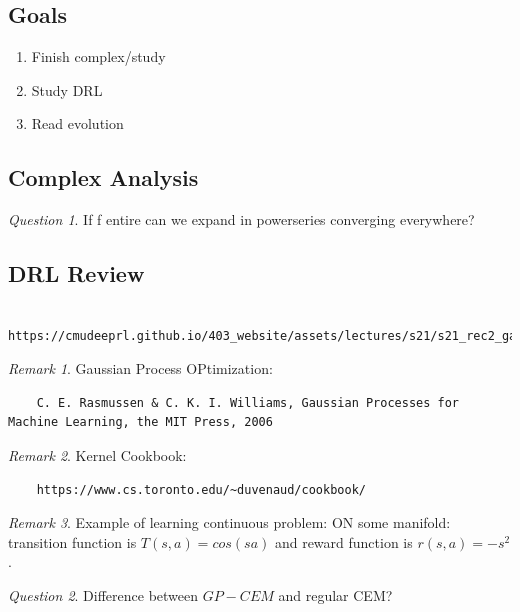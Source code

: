 \documentclass[11pt]{article}
\theoremstyle{remark}
\newtheorem{remark}{Remark}
\newtheorem{quest}{Question}
\begin{document}
\subsection{Goals}

\begin{enumerate}
	\item Finish complex/study
	\item Study DRL
	\item Read evolution
\end{enumerate}

\subsection{Complex Analysis}

\begin{quest}
	If f entire can we expand in powerseries converging everywhere?
\end{quest}

\subsection{DRL Review}

\begin{verbatim}
	https://cmudeeprl.github.io/403_website/assets/lectures/s21/s21_rec2_gaussian_process.pdf
\end{verbatim}

\begin{remark}Gaussian Process OPtimization: 
\begin{verbatim}
	C. E. Rasmussen & C. K. I. Williams, Gaussian Processes for Machine Learning, the MIT Press, 2006
\end{verbatim}
\end{remark}

\begin{remark}Kernel Cookbook:
\begin{verbatim}
	https://www.cs.toronto.edu/~duvenaud/cookbook/
\end{verbatim}
\end{remark}

\begin{remark}
	Example of learning continuous problem: ON some manifold: transition function is $T(s,a) = cos(sa)$ and reward function is $r(s,a) = -s^2$. 
\end{remark}

\begin{quest}
	Difference between $GP-CEM$ and regular CEM?
\end{quest}
\end{document}
